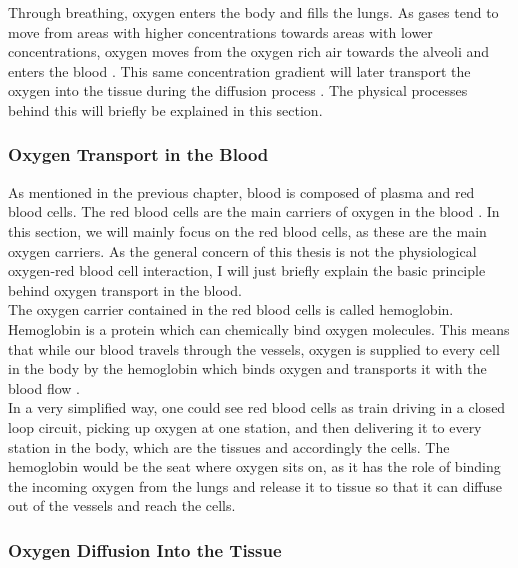 Through breathing, oxygen enters the body and fills the lungs. As gases tend to move from areas with higher concentrations towards areas with lower concentrations, oxygen moves from the oxygen rich air towards the alveoli and enters the blood \cite{bukwirwa}. This same concentration gradient will later transport the oxygen into the tissue during the diffusion process \cite{pittman2011regulation}. The physical processes behind this will briefly be explained in this section.

\subsubsection*{Oxygen Transport in the Blood}

As mentioned in the previous chapter, blood is composed of plasma and red blood cells. The red blood cells are the main carriers of oxygen in the blood \cite{pittman2011regulation}. In this section, we will mainly focus on the red blood cells, as these are the main oxygen carriers. As the general concern of this thesis is not the physiological oxygen-red blood cell interaction, I will just briefly explain the basic principle behind oxygen transport in the blood.
\\The oxygen carrier contained in the red blood cells is called hemoglobin. Hemoglobin is a protein which can chemically bind oxygen molecules. This means that while our blood travels through the vessels, oxygen is supplied to every cell in the body by the hemoglobin which binds oxygen and transports it with the blood flow \cite{hellums1977resistance}.
\\In a very simplified way, one could see red blood cells as train driving in a closed loop circuit, picking up oxygen at one station, and then delivering it to every station in the body, which are the tissues and accordingly the cells. The hemoglobin would be the seat where oxygen sits on, as it has the role of binding the incoming oxygen from the lungs and release it to tissue so that it can diffuse out of the vessels and reach the cells.

\subsubsection*{Oxygen Diffusion Into the Tissue}
\label{Diffusion}

